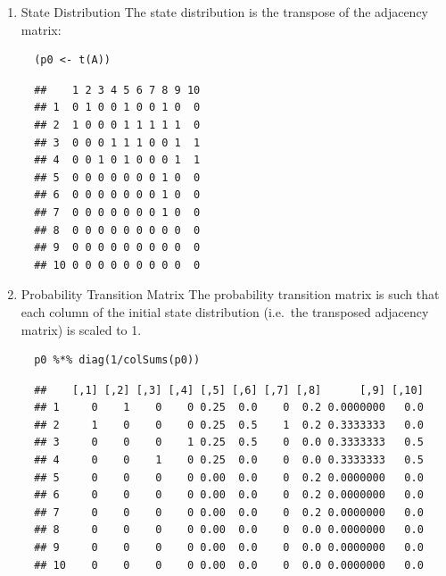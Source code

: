 \documentclass[11pt]{article}
\begin{document}
\begin{enumerate}
\begin{enumerate}
\begin{lstlisting}
  ## Adjust the Order
  (A <- A[order(as.integer(row.names(A))), order(as.integer(colnames(A)))])
\end{lstlisting}

\begin{verbatim}
  ##    1 2 3 4 5 6 7 8 9 10
  ## 1  0 1 0 0 0 0 0 0 0  0
  ## 2  1 0 0 0 0 0 0 0 0  0
  ## 3  0 0 0 1 0 0 0 0 0  0
  ## 4  0 0 1 0 0 0 0 0 0  0
  ## 5  1 1 1 1 0 0 0 0 0  0
  ## 6  0 1 1 0 0 0 0 0 0  0
  ## 7  0 1 0 0 0 0 0 0 0  0
  ## 8  1 1 0 0 1 1 1 0 0  0
  ## 9  0 1 1 1 0 0 0 0 0  0
  ## 10 0 0 1 1 0 0 0 0 0  0
\end{verbatim}

\item State Distribution
\label{state-distribution}
The state distribution is the transpose of the adjacency matrix:

\lstset{language=r,label= ,caption= ,captionpos=b,numbers=none}
\begin{lstlisting}
  (p0 <- t(A))
\end{lstlisting}

\begin{verbatim}
  ##    1 2 3 4 5 6 7 8 9 10
  ## 1  0 1 0 0 1 0 0 1 0  0
  ## 2  1 0 0 0 1 1 1 1 1  0
  ## 3  0 0 0 1 1 1 0 0 1  1
  ## 4  0 0 1 0 1 0 0 0 1  1
  ## 5  0 0 0 0 0 0 0 1 0  0
  ## 6  0 0 0 0 0 0 0 1 0  0
  ## 7  0 0 0 0 0 0 0 1 0  0
  ## 8  0 0 0 0 0 0 0 0 0  0
  ## 9  0 0 0 0 0 0 0 0 0  0
  ## 10 0 0 0 0 0 0 0 0 0  0
\end{verbatim}

\item Probability Transition Matrix
\label{probability-transition-matrix}
The probability transition matrix is such that each column of the
initial state distribution (i.e. the transposed adjacency matrix) is
scaled to 1.

\lstset{language=r,label= ,caption= ,captionpos=b,numbers=none}
\begin{lstlisting}
  p0 %*% diag(1/colSums(p0))
\end{lstlisting}

\begin{verbatim}
  ##    [,1] [,2] [,3] [,4] [,5] [,6] [,7] [,8]      [,9] [,10]
  ## 1     0    1    0    0 0.25  0.0    0  0.2 0.0000000   0.0
  ## 2     1    0    0    0 0.25  0.5    1  0.2 0.3333333   0.0
  ## 3     0    0    0    1 0.25  0.5    0  0.0 0.3333333   0.5
  ## 4     0    0    1    0 0.25  0.0    0  0.0 0.3333333   0.5
  ## 5     0    0    0    0 0.00  0.0    0  0.2 0.0000000   0.0
  ## 6     0    0    0    0 0.00  0.0    0  0.2 0.0000000   0.0
  ## 7     0    0    0    0 0.00  0.0    0  0.2 0.0000000   0.0
  ## 8     0    0    0    0 0.00  0.0    0  0.0 0.0000000   0.0
  ## 9     0    0    0    0 0.00  0.0    0  0.0 0.0000000   0.0
  ## 10    0    0    0    0 0.00  0.0    0  0.0 0.0000000   0.0
\end{verbatim}


\end{enumerate}
\end{enumerate}
\end{document}
